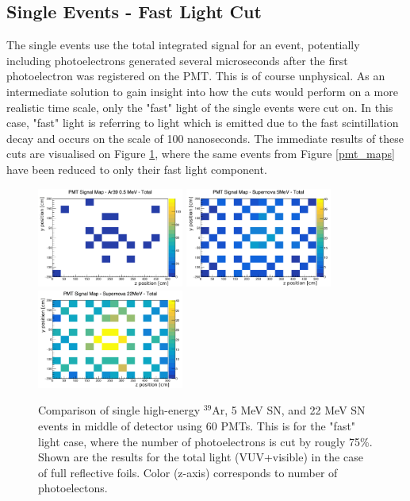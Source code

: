 \documentclass[a4paper]{article}
\begin{document}
\subsection{Single Events - Fast Light Cut}

The single events use the total integrated signal for an event, potentially including photoelectrons generated several microseconds after the first photoelectron was registered on the PMT. This is of course unphysical. As an intermediate solution to gain insight into how the cuts would perform on a more realistic time scale, only the "fast" light of the single events were cut on. In this case, "fast" light is referring to light which is emitted due to the fast scintillation decay and occurs on the scale of 100 nanoseconds. The immediate results of these cuts are visualised on Figure \ref{pmt_maps_fastlight}, where the same events from Figure \ref{pmt_maps} have been reduced to only their fast light component.

\begin{figure}[H]
  \center
      \includegraphics[width=0.43\textwidth]{ar39_signal_map_improved_fastlight_2_labels.pdf}
      \includegraphics[width=0.43\textwidth]{sn_signal_map_improved_fastlight_labels.pdf}
      \includegraphics[width=0.43\textwidth]{sn_signal_map_higherE_improved_fastlight_labels.pdf}
      \caption{Comparison of single high-energy $^{39}$Ar, 5 MeV SN, and 22 MeV SN events in middle of detector using 60 PMTs. This is for the "fast" light case, where the number of photoelectrons is cut by rougly 75\%. Shown are the results for the total light (VUV+visible) in the case of full reflective foils. Color (z-axis) corresponds to number of photoelectons.}\label{pmt_maps_fastlight}
\end{figure}
\end{document}
